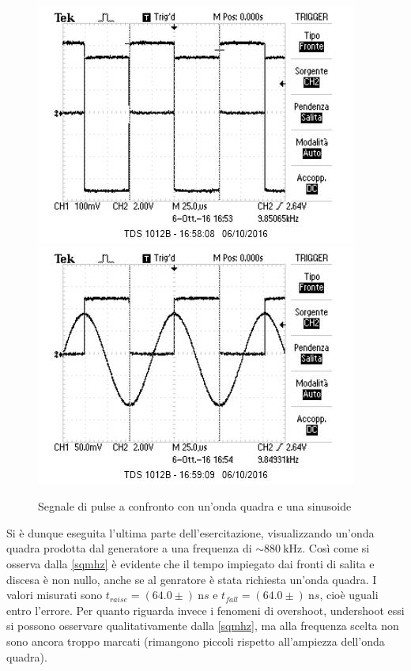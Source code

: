 \documentclass[10pt,a4paper]{article}
\begin{document}
\begin{figure}[h]
	\centering
	\includegraphics[scale=0.6]{../Oscilloscopio/trig_pulse_square.jpg}
	\includegraphics[scale=0.6]{../Oscilloscopio/trig_pulse_sin.jpg}
	\caption{Segnale di pulse a confronto con un'onda quadra e una sinusoide}
	\label{f:pulse}
\end{figure}

Si è dunque eseguita l'ultima parte dell'esercitazione, visualizzando un'onda quadra prodotta dal generatore a una frequenza di $\sim880~\text{kHz}$.
Così come si osserva dalla \figurename{\ref{sqmhz}} è evidente che il tempo impiegato dai fronti di salita e discesa è non nullo, anche se al genratore è stata richiesta un'onda quadra. I valori misurati sono $t_{raise} = (64.0 \pm )~\text{n}s$ e $t_{fall} = (64.0 \pm )~\text{n}s$, cioè uguali entro l'errore. %
Per quanto riguarda invece i fenomeni di overshoot, undershoot essi si possono osservare qualitativamente dalla \figurename{\ref{sqmhz}}, ma alla frequenza scelta non sono ancora troppo marcati (rimangono piccoli rispetto all'ampiezza dell'onda quadra).
\end{document}
